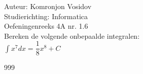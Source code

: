 \documentclass[a4paper]{article}
\newcommand{\dint}{\displaystyle\int}
\begin{document}
	
	\noindent \large Auteur: Komronjon Vosidov \\
	\noindent \large Studierichting: Informatica\\
	\noindent \large Oefeningenreeks 4A nr. 1.6\\
	
	
	\medskip
	\normalsize
	Bereken de volgende onbepaalde integralen:\\
	
	$\dint x^7 dx = \dfrac{1}{8}x^8 + C $ \\
	
	
	
	
	
	
	\begin{thebibliography}{999}
	\end{thebibliography}		
\end{document}
